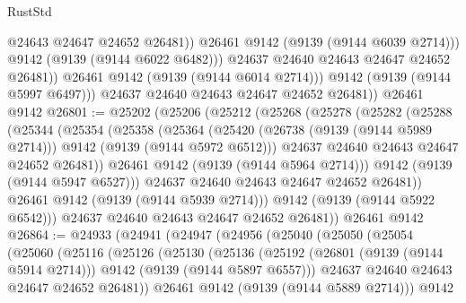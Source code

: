\begin{lexlean}{RustStd}
\begin{coremodule}
                        @24643
                        @24647
                        @24652
                        @26481))
                    @26461
                    @9142
                    (@9139 (@9144 @6039 @2714)))
                  @9142
                  (@9139 (@9144 @6022 @6482)))
                @24637
                @24640
                @24643
                @24647
                @24652
                @26481))
            @26461
            @9142
            (@9139 (@9144 @6014 @2714)))
          @9142
          (@9139 (@9144 @5997 @6497)))
        @24637
        @24640
        @24643
        @24647
        @24652
        @26481))
    @26461
    @9142
@26801 := @25202
    (@25206
      (@25212
        (@25268
          (@25278
            (@25282
              (@25288
                (@25344
                  (@25354
                    (@25358
                      (@25364
                        (@25420
                          (@26738 (@9139 (@9144 @5989 @2714)))
                          @9142
                          (@9139 (@9144 @5972 @6512)))
                        @24637
                        @24640
                        @24643
                        @24647
                        @24652
                        @26481))
                    @26461
                    @9142
                    (@9139 (@9144 @5964 @2714)))
                  @9142
                  (@9139 (@9144 @5947 @6527)))
                @24637
                @24640
                @24643
                @24647
                @24652
                @26481))
            @26461
            @9142
            (@9139 (@9144 @5939 @2714)))
          @9142
          (@9139 (@9144 @5922 @6542)))
        @24637
        @24640
        @24643
        @24647
        @24652
        @26481))
    @26461
    @9142
@26864 := @24933
    (@24941
      (@24947
        (@24956
          (@25040
            (@25050
              (@25054
                (@25060
                  (@25116
                    (@25126
                      (@25130
                        (@25136
                          (@25192
                            (@26801 (@9139 (@9144 @5914 @2714)))
                            @9142
                            (@9139 (@9144 @5897 @6557)))
                          @24637
                          @24640
                          @24643
                          @24647
                          @24652
                          @26481))
                      @26461
                      @9142
                      (@9139 (@9144 @5889 @2714)))
                    @9142

\end{coremodule}
\end{lexlean}
